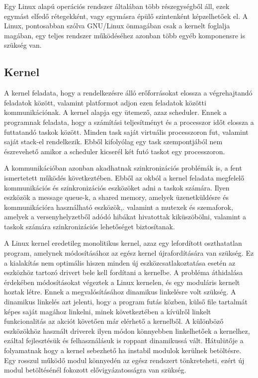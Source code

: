 Egy Linux alapú operációs rendszer általában több részegységből áll, ezek egymást
elfedő rétegekként, vagy egymásra épülő szintenként képzelhetőek el. A Linux,
pontosabban szólva GNU/Linux önmagában csak a kernelt foglalja magában, egy
teljes rendszer működéséhez azonban több egyéb komponensre is szükség van.

\subsection{Kernel}

A kernel feladata, hogy a rendelkezésre álló erőforrásokat elossza a
végrehajtandó feladatok között, valamint platformot adjon ezen feladatok közötti
kommunikációnak. A kernel alapja egy ütemező, azaz scheduler. Ennek a programnak
feladata, hogy a számítási teljesítményt és a processzor időt elossza a
futtatandó taskok között. Minden task saját virtuális processzoron fut, valamint
saját stack-el rendelkezik. Ebből kifolyólag egy task szempontjából nem
észrevehető amikor a scheduler kicserél két futó taskot egy processzoron.

A kommunikációban azonban akadhatnak szinkronizációs problémák is, a fent
ismertetett működés következtében. Ebből az okból a kernel feladata megfelelő
kommunikációs és szinkronizációs eszközöket adni a taskok számára. Ilyen eszközök
a message queue-k, a shared memory, amelyek üzenetküldésre és kommunikációra
használható eszközök,. valamint a mutexek és szemaforok, amelyek a
versenyhelyzetből adódó hibákat hivatottak kiküszöbölni, valamint a taskok
számára szinkronizációs lehetőséget biztosítanak.

A Linux kernel eredetileg monolitikus kernel, azaz egy lefordított oszthatatlan
program, amelynek módosításához az egész kernel újrafordítására van szükség. Ez a
kialakítás nem optimális hiszen minden új eszközcsatlakoztatása esetén az
eszközhöz tartozó drivert bele kell fordítani a kernelbe. A probléma áthidalása
érdekében módosításokat végeztek a Linux kernelen, és egy moduláris kernelt
hoztak létre. Ennek a megvalósításához dinamikus linkelésre volt szükség.  A
dinamikus linkelés azt jelenti, hogy a program futás közben, külső file tartalmát
képes saját magához linkelni, minek következtében a kívülről linkelt
funkcionalitás az akciót követően már elérhető a kernelből. A különböző
eszközökhöz használt driverek ilyen módon könnyebben linkelhetőek a kernelhez,
ezáltal fejlesztésük és felhasználásuk is roppant dinamikussá vált. Hátulütője a
folyamatnak hogy a kernel sebezhető ha instabil modulok kerülnek betöltésre. Egy
rosszul működő modul könnyedén az egész rendszert tönkreteheti, ezért új modul
betöltésénél fokozott elővigyázatosságra van szükség.

